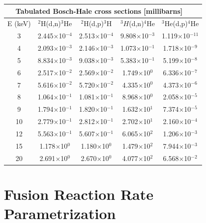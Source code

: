{
\noindent
\begin{table}[h!]\small
  \noindent
  \centering
  \begin{tabular}{c c c c c}
    \multicolumn{5}{c}{Tabulated Bosch-Hale cross sections [millibarns]~~\cite{bosch}}\\
    \hline
    E (keV) \T\B& $^2$H(d,n)$^3$He & $^2$H(d,p)$^3$H & $^3H$(d,n)$^4$He & $^3$He(d,p)$^4$He\\
    \hline\hline
    3\T& 2.445$\times$10$^{-4}$ & 2.513$\times$10$^{-4}$ & 9.808$\times$10$^{-3}$ & 1.119$\times$10$^{-11}$ \\ 
    4 & 2.093$\times$10$^{-3}$ & 2.146$\times$10$^{-3}$ & 1.073$\times$10$^{-1}$ & 1.718$\times$10$^{-9}$ \\ 
    5 & 8.834$\times$10$^{-3}$ & 9.038$\times$10$^{-3}$ & 5.383$\times$10$^{-1}$ & 5.199$\times$10$^{-8}$ \\
    6 & 2.517$\times$10$^{-2}$ & 2.569$\times$10$^{-2}$ & 1.749$\times$10$^0$    & 6.336$\times$10$^{-7}$ \\
    7 & 5.616$\times$10$^{-2}$ & 5.720$\times$10$^{-2}$ & 4.335$\times$10$^0$    & 4.373$\times$10$^{-6}$ \\
    8 & 1.064$\times$10$^{-1}$ & 1.081$\times$10$^{-1}$ & 8.968$\times$10$^0$    & 2.058$\times$10$^{-5}$ \\
    9 & 1.794$\times$10$^{-1}$ & 1.820$\times$10$^{-1}$ & 1.632$\times$10$^1$    & 7.374$\times$10$^{-5}$ \\
   10 & 2.779$\times$10$^{-1}$ & 2.812$\times$10$^{-1}$ & 2.702$\times$10$^1$    & 2.160$\times$10$^{-4}$ \\
   12 & 5.563$\times$10$^{-1}$ & 5.607$\times$10$^{-1}$ & 6.065$\times$10$^2$    & 1.206$\times$10$^{-3}$ \\
   15 & 1.178$\times$10$^{0}$  & 1.180$\times$10$^{0}$  & 1.479$\times$10$^2$    & 7.944$\times$10$^{-3}$ \\
   20\B& 2.691$\times$10$^{0}$  & 2.670$\times$10$^{0}$  & 4.077$\times$10$^2$    & 6.568$\times$10$^{-2}$ \\
   \hline
  \end{tabular}
  \label{table:xs}
\end{table}

\vfill

\pagebreak
{}
\section{Fusion Reaction Rate Parametrization}

}
